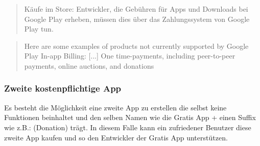 \documentclass[FIPLY_base.tex]{subfiles}
\begin{document}
\begin{quote}
Käufe im Store: Entwickler, die Gebühren für Apps und Downloads bei Google Play erheben, müssen dies über das Zahlungssystem von Google Play tun.
\end{quote}\cite{gpDevContentPolicy} 

\begin{quote}
Here are some examples of products not currently supported by Google Play In-app Billing: [...]
One time-payments, including peer-to-peer payments, online auctions, and donations
\end{quote}\cite{gpInAppBilling} 

\subsubsection{Zweite kostenpflichtige App}
Es besteht die Möglichkeit eine zweite App zu erstellen die selbst keine Funktionen beinhaltet und den selben Namen wie die Gratis App + einen Suffix wie z.B.: (Donation) trägt.
In diesem Falle kann ein zufriedener Benutzer diese zweite App kaufen und so den Entwickler der Gratis App unterstützen.
\end{document}
